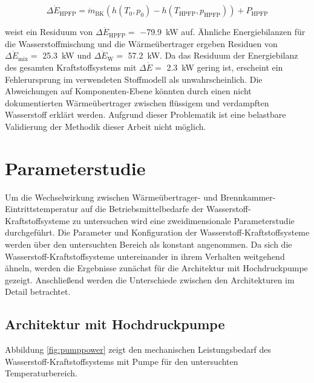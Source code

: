 \begin{equation}\label{Eq:brewer}
	\Delta \dot{E}_\mathrm{HPFP}=\dot{m}_\mathrm{BK}(h(T_0,p_0)-h(T_\mathrm{HPFP}, p_\mathrm{HPFP}))+P_\mathrm{HPFP}
\end{equation}

weist ein Residuum von $\Delta \dot{E}_\mathrm{HPFP}=$ \SI{-79.9}{\kilo\W} auf. Ähnliche Energiebilanzen für die Wasserstoffmischung und die Wärmeübertrager ergeben Residuen von $\Delta \dot{E}_\mathrm{mix}=$ \SI{25.3}{\kilo\W} und $\Delta \dot{E}_\mathrm{W}=$ \SI{57.2}{\kilo\W}. Da das Residuum der Energiebilanz des gesamten Kraftstoffsystems mit $\Delta \dot{E}=$ \SI{2.3}{\kilo\W} gering ist, erscheint ein Fehlerursprung im verwendeten Stoffmodell als unwahrscheinlich. Die Abweichungen auf Komponenten-Ebene könnten durch einen nicht dokumentierten Wärmeübertrager zwischen flüssigem und verdampften Wasserstoff erklärt werden. Aufgrund dieser Problematik ist eine belastbare Validierung der Methodik dieser Arbeit nicht möglich.

\section{Parameterstudie}

Um die Wechselwirkung zwischen Wärmeübertrager- und Brennkammer-Eintrittstemperatur auf die Betriebsmittelbedarfe der Wasserstoff-Kraftstoffsysteme zu untersuchen wird eine zweidimensionale Parameterstudie durchgeführt. Die Parameter und Konfiguration der Wasserstoff-Kraftstoffsysteme werden über den untersuchten Bereich als konstant angenommen. Da sich die Wasserstoff-Kraftstoffsysteme untereinander in ihrem Verhalten weitgehend ähneln, werden die Ergebnisse zunächst für die Architektur mit Hochdruckpumpe gezeigt. Anschließend werden die Unterschiede zwischen den Architekturen im Detail betrachtet.

\subsection{Architektur mit Hochdruckpumpe}

Abbildung \ref{fig:pumppower} zeigt den mechanischen Leistungsbedarf des Wasserstoff-Kraftstoffsystems mit Pumpe für den untersuchten Temperaturbereich. 

